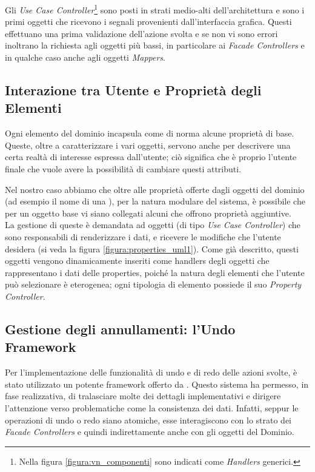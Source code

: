 Gli \emph{Use Case Controller}\footnote{Nella figura \ref{figura:vn_componenti} sono indicati come \emph{Handlers} generici.} sono posti in strati medio-alti dell'architettura e sono i primi oggetti che ricevono i segnali provenienti dall'interfaccia grafica. Questi effettuano una prima validazione dell'azione svolta e se non vi sono errori inoltrano la richiesta agli oggetti più bassi, in particolare ai \emph{Facade Controllers} e in qualche caso anche agli oggetti \emph{Mappers}.


\subsection{Interazione tra Utente e Proprietà degli Elementi}
Ogni elemento del dominio incapsula come di norma alcune proprietà di base. Queste, oltre a caratterizzare i vari oggetti, servono anche per descrivere una certa realtà di interesse espressa dall'utente; ciò significa che è proprio l'utente finale che vuole avere la possibilità di cambiare questi attributi.

Nel nostro caso abbiamo che oltre alle proprietà offerte dagli oggetti del dominio (ad esempio il nome di una \virtualmachine{}), per la natura modulare del sistema, è possibile che per un oggetto base vi siano collegati alcuni \plugin{} che offrono proprietà aggiuntive.\\
La gestione di queste è demandata ad oggetti (di tipo \emph{Use Case Controller}) che sono responsabili di renderizzare i dati, e ricevere le modifiche che l'utente desidera (si veda la figura \ref{figura:properties_uml1}). Come già descritto, questi oggetti vengono dinamicamente inseriti come handlers degli oggetti che rappresentano i dati delle properties, poiché la natura degli elementi che l'utente può selezionare è eterogenea; ogni tipologia di elemento possiede il suo \emph{Property Controller}.

\subsection{Gestione degli annullamenti: l'Undo Framework}
Per l'implementazione delle funzionalità di undo e di redo delle azioni svolte, è stato utilizzato un potente framework offerto da \qt{}. Questo sistema ha permesso, in fase realizzativa, di tralasciare molte dei dettagli implementativi e dirigere l'attenzione verso problematiche come la consistenza dei dati. Infatti, seppur le operazioni di undo o redo siano atomiche, esse interagiscono con lo strato dei \emph{Facade Controllers} e quindi indirettamente anche con gli oggetti del Dominio.

